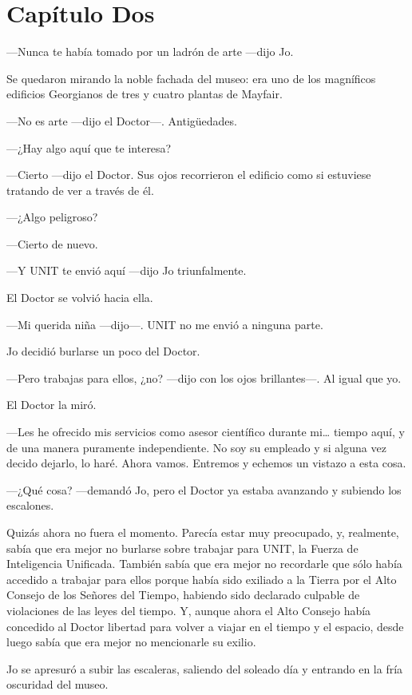 \chapter*{Capítulo Dos}

---Nunca te había tomado por un ladrón de arte ---dijo Jo.

Se quedaron mirando la noble fachada del museo: era uno de los
magníficos edificios Georgianos de tres y cuatro plantas de Mayfair.

---No es arte ---dijo el Doctor---. Antigüedades.

---¿Hay algo aquí que te interesa?

---Cierto ---dijo el Doctor. Sus ojos recorrieron el edificio como si
estuviese tratando de ver a través de él.

---¿Algo peligroso?

---Cierto de nuevo.

---Y UNIT te envió aquí ---dijo Jo triunfalmente.

El Doctor se volvió hacia ella.

---Mi querida niña ---dijo---. UNIT no me envió a ninguna parte.

Jo decidió burlarse un poco del Doctor.

---Pero trabajas para ellos, ¿no? ---dijo con los ojos brillantes---. Al
igual que yo.

El Doctor la miró.

---Les he ofrecido mis servicios como asesor científico durante
mi\ldots{} tiempo aquí, y de una manera puramente independiente. No soy
su empleado y si alguna vez decido dejarlo, lo haré. Ahora vamos.
Entremos y echemos un vistazo a esta cosa.

---¿Qué cosa? ---demandó Jo, pero el Doctor ya estaba avanzando y
subiendo los escalones.

Quizás ahora no fuera el momento. Parecía estar muy preocupado, y,
realmente, sabía que era mejor no burlarse sobre trabajar para UNIT, la
Fuerza de Inteligencia Unificada. También sabía que era mejor no
recordarle que sólo había accedido a trabajar para ellos porque había
sido exiliado a la Tierra por el Alto Consejo de los Señores del Tiempo,
habiendo sido declarado culpable de violaciones de las leyes del tiempo.
Y, aunque ahora el Alto Consejo había concedido al Doctor libertad para
volver a viajar en el tiempo y el espacio, desde luego sabía que era
mejor no mencionarle su exilio.

Jo se apresuró a subir las escaleras, saliendo del soleado día y
entrando en la fría oscuridad del museo.

